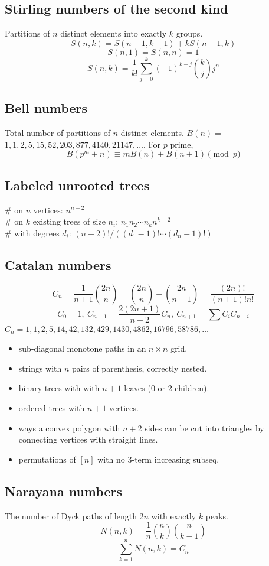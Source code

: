 	\subsection{Stirling numbers of the second kind}
		Partitions of $n$ distinct elements into exactly $k$ groups.
		$$S(n,k) = S(n-1,k-1) + k S(n-1,k)$$
		$$S(n,1) = S(n,n) = 1$$
		$$S(n,k) = \frac{1}{k!}\sum_{j=0}^k (-1)^{k-j}\binom{k}{j}j^n$$

	\subsection{Bell numbers}
		Total number of partitions of $n$ distinct elements. $B(n) =$
		$1, 1, 2, 5, 15, 52, 203, 877, 4140, 21147, \dots$. For $p$ prime,
		$$ B(p^m+n)\equiv mB(n)+B(n+1) \pmod{p} $$

	\subsection{Labeled unrooted trees}
		\# on $n$ vertices: $n^{n-2}$ \\
		\# on $k$ existing trees of size $n_i$: $n_1n_2\cdots n_k n^{k-2}$ \\
		\# with degrees $d_i$: $(n-2)! / ((d_1-1)! \cdots (d_n-1)!)$

	\subsection{Catalan numbers}
		$$ C_n=\frac{1}{n+1}\binom{2n}{n}= \binom{2n}{n}-\binom{2n}{n+1} = \frac{(2n)!}{(n+1)!n!} $$
		$$ C_0=1,\ C_{n+1} = \frac{2(2n+1)}{n+2}C_n,\ C_{n+1}=\sum C_iC_{n-i} $$
		${C_n = 1, 1, 2, 5, 14, 42, 132, 429, 1430, 4862, 16796, 58786, \dots}$
		\begin{itemize}[noitemsep]
			\item sub-diagonal monotone paths in an $n\times n$ grid.
			\item strings with $n$ pairs of parenthesis, correctly nested.
			\item binary trees with with $n+1$ leaves (0 or 2 children).
			\item ordered trees with $n+1$ vertices.
			\item ways a convex polygon with $n+2$ sides can be cut into triangles by connecting vertices with straight lines.
			\item permutations of $[n]$ with no 3-term increasing subseq.
		\end{itemize}

	\subsection{Narayana numbers}
		The number of Dyck paths of length $2n$ with exactly $k$ peaks.
		$$ N(n,k) = \frac{1}{n}\binom{n}{k}\binom{n}{k-1} $$
		$$ \sum_{k=1}^n N(n,k) = C_n $$
